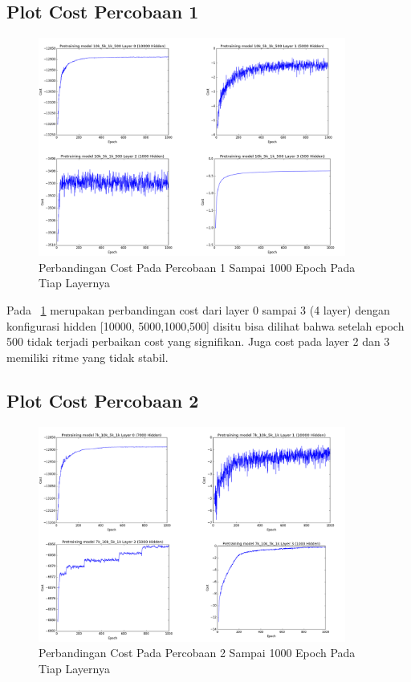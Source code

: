 \subsection{Plot Cost Percobaan 1}

\begin{figure}
	\centering
	\includegraphics[width=0.9\textwidth]
		{pics/percobaan_1.png}
	\caption{Perbandingan Cost Pada Percobaan 1 Sampai 1000 Epoch Pada Tiap Layernya}
	\label{fig:percobaan1}
\end{figure}

Pada \pic~\ref{fig:percobaan1} merupakan perbandingan cost dari layer 0 sampai 3 (4 layer) dengan konfigurasi hidden [10000, 5000,1000,500] disitu bisa dilihat bahwa setelah epoch 500 tidak terjadi perbaikan cost yang signifikan. Juga cost pada layer 2 dan 3 memiliki ritme yang tidak stabil.

\subsection{Plot Cost Percobaan 2}
\begin{figure}
	\centering
	\includegraphics[width=0.9\textwidth]
		{pics/percobaan_2.png}
	\caption{Perbandingan Cost Pada Percobaan 2 Sampai 1000 Epoch Pada Tiap Layernya}
	\label{fig:percobaan2}
\end{figure}


